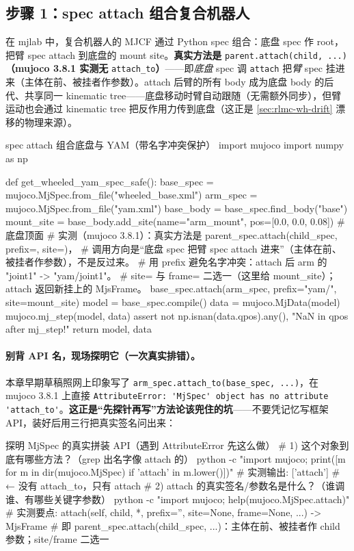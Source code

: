 \subsection{步骤 1：spec attach 组合复合机器人}
\label{sec:rlmc-wh-attach}

在 mjlab 中，复合机器人的 MJCF 通过 Python spec 组合：底盘 spec 作 root，把臂 spec attach 到底盘的 mount site。\textbf{真实方法是} \verb|parent.attach(child, ...)|\textbf{（mujoco 3.8.1 实测无} \verb|attach_to|\textbf{）}——即\emph{底盘} spec 调 \verb|attach| 把\emph{臂} spec 挂进来（主体在前、被挂者作参数）。attach 后臂的所有 body 成为底盘 body 的后代、共享同一 kinematic tree——底盘移动时臂自动跟随（无需额外同步），但臂运动也会通过 kinematic tree 把反作用力传到底盘（这正是 \cref{sec:rlmc-wh-drift} 漂移的物理来源）。

\begin{codebox}[Python]{spec attach 组合底盘与 YAM（带名字冲突保护）}
import mujoco
import numpy as np

def get_wheeled_yam_spec_safe():
    base_spec = mujoco.MjSpec.from_file("wheeled_base.xml")
    arm_spec  = mujoco.MjSpec.from_file("yam.xml")
    base_body = base_spec.find_body("base")
    mount_site = base_body.add_site(name="arm_mount", pos=[0.0, 0.0, 0.08])  # 底盘顶面
    # 实测（mujoco 3.8.1）：真实方法是 parent_spec.attach(child_spec, prefix=, site=)，
    # 调用方向是“底盘 spec 把臂 spec attach 进来”（主体在前、被挂者作参数），不是反过来。
    # 用 prefix 避免名字冲突：attach 后 arm 的 "joint1" -> "yam/joint1"。
    # site= 与 frame= 二选一（这里给 mount_site）；attach 返回新挂上的 MjsFrame。
    base_spec.attach(arm_spec, prefix="yam/", site=mount_site)
    model = base_spec.compile()
    data  = mujoco.MjData(model)
    mujoco.mj_step(model, data)
    assert not np.isnan(data.qpos).any(), "NaN in qpos after mj_step!"
    return model, data
\end{codebox}

\paragraph{别背 API 名，现场探明它（一次真实排错）。}本章早期草稿照网上印象写了 \verb|arm_spec.attach_to(base_spec, ...)|，在 mujoco 3.8.1 上直接 \verb|AttributeError: 'MjSpec' object has no attribute 'attach_to'|。\textbf{这正是“先探针再写”方法论该兜住的坑}——不要凭记忆写框架 API，装好后用三行把真实签名问出来：

\begin{codebox}[bash]{探明 MjSpec 的真实拼装 API（遇到 AttributeError 先这么做）}
# 1) 这个对象到底有哪些方法？（grep 出名字像 attach 的）
python -c "import mujoco; print([m for m in dir(mujoco.MjSpec) if 'attach' in m.lower()])"
#   实测输出: ['attach']      # ← 没有 attach_to，只有 attach
# 2) attach 的真实签名/参数名是什么？（谁调谁、有哪些关键字参数）
python -c "import mujoco; help(mujoco.MjSpec.attach)"
#   实测要点: attach(self, child, *, prefix='', site=None, frame=None, ...) -> MjsFrame
#            即 parent_spec.attach(child_spec, ...)：主体在前、被挂者作 child 参数；site/frame 二选一
\end{codebox}

